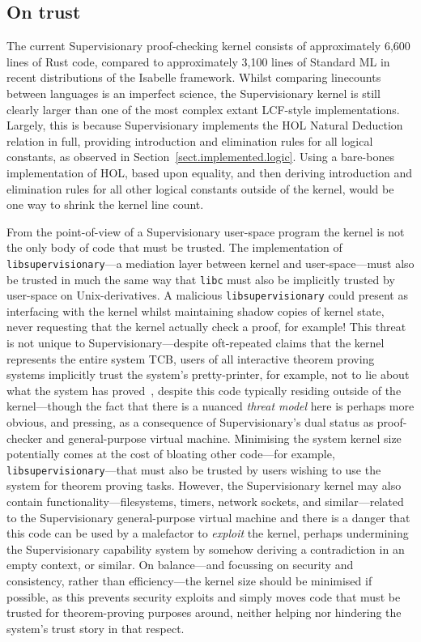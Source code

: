 \documentclass[a4paper, UKenglish, cleveref, autoref, thm-restate, colorlinks]{lipics-v2021}
\begin{document}
\subsection{On trust}

The current Supervisionary proof-checking kernel consists of approximately 6,600 lines of Rust code, compared to approximately 3,100 lines of Standard ML in recent distributions of the Isabelle framework.
Whilst comparing linecounts between languages is an imperfect science, the Supervisionary kernel is still clearly larger than one of the most complex extant LCF-style implementations.
Largely, this is because Supervisionary implements the HOL Natural Deduction relation in full, providing introduction and elimination rules for all logical constants, as observed in Section~\ref{sect.implemented.logic}.
Using a bare-bones implementation of HOL, based upon equality, and then deriving introduction and elimination rules for all other logical constants outside of the kernel, would be one way to shrink the kernel line count.

From the point-of-view of a Supervisionary user-space program the kernel is not the only body of code that must be trusted.
The implementation of \texttt{libsupervisionary}---a mediation layer between kernel and user-space---must also be trusted in much the same way that \texttt{libc} must also be implicitly trusted by user-space on Unix-derivatives.
A malicious \texttt{libsupervisionary} could present as interfacing with the kernel whilst maintaining shadow copies of kernel state, never requesting that the kernel actually check a proof, for example!
This threat is not unique to Supervisionary---despite oft-repeated claims that the kernel represents the entire system TCB, users of all interactive theorem proving systems implicitly trust the system's pretty-printer, for example, not to lie about what the system has proved~\cite{10.1093/oso/9780198501275.003.0013}, despite this code typically residing outside of the kernel---though the fact that there is a nuanced \emph{threat model} here is perhaps more obvious, and pressing, as a consequence of Supervisionary's dual status as proof-checker and general-purpose virtual machine.
Minimising the system kernel size potentially comes at the cost of bloating other code---for example, \texttt{libsupervisionary}---that must also be trusted by users wishing to use the system for theorem proving tasks.
However, the Supervisionary kernel may also contain functionality---filesystems, timers, network sockets, and similar---related to the Supervisionary general-purpose virtual machine and there is a danger that this code can be used by a malefactor to \emph{exploit} the kernel, perhaps undermining the Supervisionary capability system by somehow deriving a contradiction in an empty context, or similar.
On balance---and focussing on security and consistency, rather than efficiency---the kernel size should be minimised if possible, as this prevents security exploits and simply moves code that must be trusted for theorem-proving purposes around, neither helping nor hindering the system's trust story in that respect.
\end{document}
